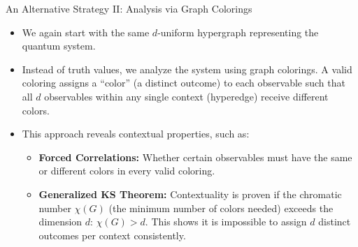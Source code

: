 \documentclass{beamer}
\begin{document}
\begin{frame}[shrink=5]{An Alternative Strategy II: Analysis via Graph Colorings}
    \begin{itemize} [<+->] %
        \item We again start with the same \alert{$d$-uniform hypergraph} representing the quantum system.
        \vspace{1.5em}
        \item Instead of truth values, we analyze the system using \alert{graph colorings}. A valid coloring assigns a ``color''
(a distinct outcome) to each observable such that all $d$ observables within any single context (hyperedge) receive different colors.
        \vspace{1.5em}
        \item This approach reveals contextual properties, such as:
        \begin{itemize}[<+->] %
            \item \textbf{Forced Correlations:} Whether certain observables must have the same or different colors in every valid coloring.
            \vspace{1em}
            \item \textbf{Generalized KS Theorem:} Contextuality is proven if the \alert{chromatic number $\chi(G)$} (the minimum number of colors needed) \alert{exceeds the dimension $d$}: $\chi(G) > d$.
 This shows it is impossible to assign $d$ distinct outcomes per context consistently.
        \end{itemize}
    \end{itemize}
\end{frame}
\end{document}
